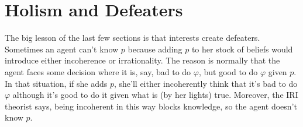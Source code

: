 \documentclass[oneside]{book}
\begin{document}
%
%
%
%

\section{Holism and Defeaters} \label{sect:holism}
The big lesson of the last few sections is that interests create defeaters. Sometimes an agent can't know $p$ because adding $p$ to her stock of beliefs would introduce either incoherence or irrationality. The reason is normally that the agent faces some decision where it is, say, bad to do $\varphi$, but good to do $\varphi$ given $p$. In that situation, if she adds $p$, she'll either incoherently think that it's bad to do $\varphi$ although it's good to do it given what is (by her lights) true. Moreover, the IRI theorist says, being incoherent in this way blocks knowledge, so the agent doesn't know $p$.
\end{document}
